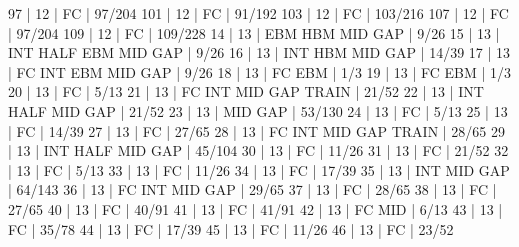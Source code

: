 97    |  12    |    FC                                        | 97/204   
101   |  12    |    FC                                        | 91/192   
103   |  12    |    FC                                        | 103/216   
107   |  12    |    FC                                        | 97/204   
109   |  12    |    FC                                        | 109/228   
14    |  13    |                   EBM  HBM  MID  GAP         | 9/26   
15    |  13    |        INT  HALF  EBM       MID  GAP         | 9/26   
16    |  13    |        INT             HBM  MID  GAP         | 14/39   
17    |  13    |    FC  INT        EBM       MID  GAP         | 9/26   
18    |  13    |    FC             EBM                        | 1/3   
19    |  13    |    FC             EBM                        | 1/3   
20    |  13    |    FC                                        | 5/13   
21    |  13    |    FC  INT                  MID  GAP  TRAIN  | 21/52   
22    |  13    |        INT  HALF            MID  GAP         | 21/52   
23    |  13    |                             MID  GAP         | 53/130   
24    |  13    |    FC                                        | 5/13   
25    |  13    |    FC                                        | 14/39   
27    |  13    |    FC                                        | 27/65   
28    |  13    |    FC  INT                  MID  GAP  TRAIN  | 28/65   
29    |  13    |        INT  HALF            MID  GAP         | 45/104   
30    |  13    |    FC                                        | 11/26   
31    |  13    |    FC                                        | 21/52   
32    |  13    |    FC                                        | 5/13   
33    |  13    |    FC                                        | 11/26   
34    |  13    |    FC                                        | 17/39   
35    |  13    |        INT                  MID  GAP         | 64/143   
36    |  13    |    FC  INT                  MID  GAP         | 29/65   
37    |  13    |    FC                                        | 28/65   
38    |  13    |    FC                                        | 27/65   
40    |  13    |    FC                                        | 40/91   
41    |  13    |    FC                                        | 41/91   
42    |  13    |    FC                       MID              | 6/13   
43    |  13    |    FC                                        | 35/78   
44    |  13    |    FC                                        | 17/39   
45    |  13    |    FC                                        | 11/26   
46    |  13    |    FC                                        | 23/52   
